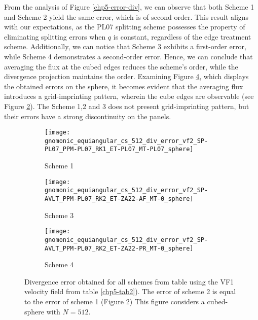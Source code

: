 From the analysis of Figure \ref{chp5-error-div}, we can observe that both Scheme 1 and Scheme 2 yield the same error,
which is of second order. This result aligns with our expectations, as the PL07 splitting scheme possesses the property of eliminating
splitting errors when $q$ is constant, regardless of the edge treatment scheme.
Additionally, we can notice that Scheme 3 exhibits a first-order error, while Scheme 4 demonstrates a second-order error.
Hence, we can conclude that averaging the flux at the cubed edges reduces the scheme's order, while the divergence projection maintains the order.
Examining Figure \ref{chp5-div}, which displays the obtained errors on the sphere, it becomes evident that the averaging
flux introduces a grid-imprinting pattern, wherein the cube edges are observable (see Figure \ref{chp5-div2}).
The Scheme 1,2 and 3 does not present grid-imprinting pattern, but their errors have a strong discontinuity on the panels.
\begin{figure}[!htb]
	\centering
	\begin{subfigure}{0.3\textwidth}
		\centering
		\texttt{[image: gnomonic\_equiangular\_cs\_512\_div\_error\_vf2\_SP-PL07\_PPM-PL07\_RK1\_ET-PL07\_MT-PL07\_sphere]}
		\caption{Scheme 1 \label{chp5-div1}}
	\end{subfigure}
	\begin{subfigure}{0.3\textwidth}
	\centering
	\texttt{[image: gnomonic\_equiangular\_cs\_512\_div\_error\_vf2\_SP-AVLT\_PPM-PL07\_RK2\_ET-ZA22-AF\_MT-0\_sphere]}
	\caption{Scheme 3 \label{chp5-div2}}
	\end{subfigure}
	\begin{subfigure}{0.3\textwidth}
	\centering
	\texttt{[image: gnomonic\_equiangular\_cs\_512\_div\_error\_vf2\_SP-AVLT\_PPM-PL07\_RK2\_ET-ZA22-PR\_MT-0\_sphere]}
	\caption{Scheme 4 \label{chp5-div3}}
	\end{subfigure}
	\caption{ Divergence error obtained for all schemes from table using the VF1 velocity field from table \ref{chp5-tab2}).
		The error of scheme 2 is equal to the error of scheme 1 (Figure 2)
		This figure considers a cubed-sphere with $N=512$. \label{chp5-div}}
\end{figure}

\newpage
